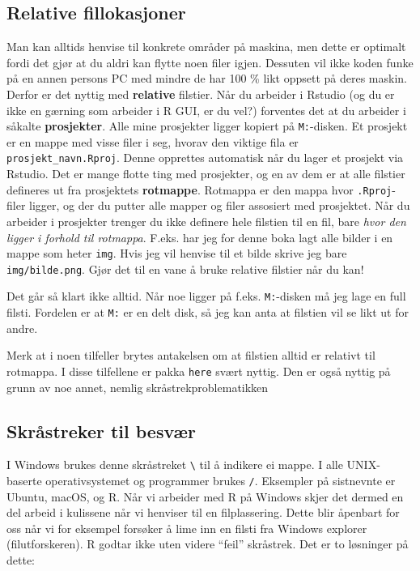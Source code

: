 \documentclass[
  letterpaper,
  DIV=11,
  numbers=noendperiod]{scrreprt}
\begin{document}
\hypertarget{sec-filkolasjon}{%
\subsection{Relative fillokasjoner}\label{sec-filkolasjon}}

Man kan alltids henvise til konkrete områder på maskina, men dette er
optimalt fordi det gjør at du aldri kan flytte noen filer igjen.
Dessuten vil ikke koden funke på en annen persons PC med mindre de har
100 \% likt oppsett på deres maskin. Derfor er det nyttig med
\textbf{relative} filstier. Når du arbeider i Rstudio (og du er ikke en
gærning som arbeider i R GUI, er du vel?) forventes det at du arbeider i
såkalte \textbf{prosjekter}. Alle mine prosjekter ligger kopiert på
\texttt{M:}-disken. Et prosjekt er en mappe med visse filer i seg,
hvorav den viktige fila er \texttt{prosjekt\_navn.Rproj}. Denne
opprettes automatisk når du lager et prosjekt via Rstudio. Det er mange
flotte ting med prosjekter, og en av dem er at alle filstier defineres
ut fra prosjektets \textbf{rotmappe}. Rotmappa er den mappa hvor
\texttt{.Rproj}-filer ligger, og der du putter alle mapper og filer
assosiert med prosjektet. Når du arbeider i prosjekter trenger du ikke
definere hele filstien til en fil, bare \emph{hvor den ligger i forhold
til rotmappa}. F.eks. har jeg for denne boka lagt alle bilder i en mappe
som heter \texttt{img}. Hvis jeg vil henvise til et bilde skrive jeg
bare \texttt{img/bilde.png}. Gjør det til en vane å bruke relative
filstier når du kan!

Det går så klart ikke alltid. Når noe ligger på f.eks.
\texttt{M:}-disken må jeg lage en full filsti. Fordelen er at
\texttt{M:} er en delt disk, så jeg kan anta at filstien vil se likt ut
for andre.

Merk at i noen tilfeller brytes antakelsen om at filstien alltid er
relativt til rotmappa. I disse tilfellene er pakka \texttt{here} svært
nyttig. Den er også nyttig på grunn av noe annet, nemlig
skråstrekproblematikken

\hypertarget{sec-slash}{%
\subsection{Skråstreker til besvær}\label{sec-slash}}

I Windows brukes denne skråstreket \texttt{\textbackslash{}} til å
indikere ei mappe. I alle UNIX-baserte operativsystemet og programmer
brukes \texttt{/}. Eksempler på sistnevnte er Ubuntu, macOS, og R. Når
vi arbeider med R på Windows skjer det dermed en del arbeid i kulissene
når vi henviser til en filplassering. Dette blir åpenbart for oss når vi
for eksempel forsøker å lime inn en filsti fra Windows explorer
(filutforskeren). R godtar ikke uten videre ``feil'' skråstrek. Det er
to løsninger på dette:
\end{document}
